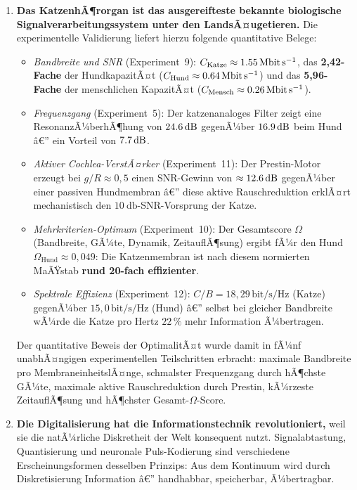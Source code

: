 ﻿\documentclass[12pt,a4paper,titlepage]{report}
\begin{document}
\begin{enumerate}[leftmargin=2em, label=\textbf{\arabic{enumi}.}]
	\item \textbf{Das KatzenhÃ¶rorgan ist das ausgereifteste bekannte biologische
		Signalverarbeitungssystem unter den LandsÃ¤ugetieren.}
		Die experimentelle Validierung liefert hierzu folgende
		quantitative Belege:
		\begin{itemize}[leftmargin=1.5em]
			\item \emph{Bandbreite und SNR} (Experiment~9):
				$C_{\mathrm{Katze}}\approx\SI{1{,}55}{\mega\bit\per\second}$,
				das \textbf{2,42-Fache} der HundkapazitÃ¤t
				($C_{\mathrm{Hund}}\approx\SI{0{,}64}{\mega\bit\per\second}$)
				und das \textbf{5,96-Fache} der menschlichen KapazitÃ¤t
				($C_{\mathrm{Mensch}}\approx\SI{0{,}26}{\mega\bit\per\second}$).
			\item \emph{Frequenzgang} (Experiment~5):
				Der katzenanaloges Filter zeigt eine ResonanzÃ¼berhÃ¶hung
				von $\SI{24{,}6}{\decibel}$ gegenÃ¼ber $\SI{16{,}9}{\decibel}$
				beim Hund â€” ein Vorteil von $\SI{7{,}7}{\decibel}$.
			\item \emph{Aktiver Cochlea-VerstÃ¤rker} (Experiment~11):
				Der Prestin-Motor erzeugt bei $g/R\approx0{,}5$
				einen SNR-Gewinn von $\approx\SI{12{,}6}{\decibel}$
				gegenÃ¼ber einer passiven Hundmembran â€”
				diese aktive Rauschreduktion erklÃ¤rt mechanistisch
				den $\SI{10}{\decibel}$-SNR-Vorsprung der Katze.
			\item \emph{Mehrkriterien-Optimum} (Experiment~10):
				Der Gesamtscore $\Omega$ (Bandbreite, GÃ¼te,
				Dynamik, ZeitauflÃ¶sung) ergibt fÃ¼r den Hund
				$\Omega_{\mathrm{Hund}}\approx0{,}049$:
				Die Katzenmembran ist nach diesem normierten
				MaÃŸstab \textbf{rund 20-fach effizienter}.
			\item \emph{Spektrale Effizienz} (Experiment~12):
				$C/B=18{,}29\,\mathrm{bit/s/Hz}$ (Katze)
				gegenÃ¼ber $15{,}0\,\mathrm{bit/s/Hz}$ (Hund) â€”
				selbst bei gleicher Bandbreite wÃ¼rde die Katze
				pro Hertz $22\,\%$ mehr Information Ã¼bertragen.
		\end{itemize}
		Der quantitative Beweis der OptimalitÃ¤t wurde damit in
		fÃ¼nf unabhÃ¤ngigen experimentellen Teilschritten erbracht:
		maximale Bandbreite pro MembraneinheitslÃ¤nge,
		schmalster Frequenzgang durch hÃ¶chste GÃ¼te,
		maximale aktive Rauschreduktion durch Prestin,
		kÃ¼rzeste ZeitauflÃ¶sung und hÃ¶chster Gesamt-$\Omega$-Score.

	\item \textbf{Die Digitalisierung hat die Informationstechnik revolutioniert,}
		weil sie die natÃ¼rliche Diskretheit der Welt konsequent nutzt.
		Signalabtastung, Quantisierung und neuronale Puls-Kodierung
		sind verschiedene Erscheinungsformen desselben Prinzips:
		Aus dem Kontinuum wird durch Diskretisierung Information â€”
		handhabbar, speicherbar, Ã¼bertragbar.

\end{enumerate}
\end{document}
